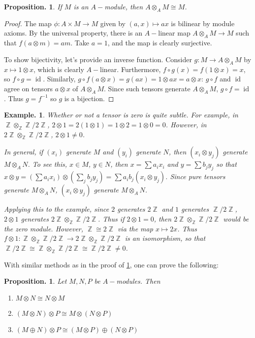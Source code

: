 \documentclass[11pt, a4paper]{memoir}
\DeclareMathOperator{\Z}{{\mathbb{Z}}}
\theoremstyle{change}
\newtheorem{proposition}[theorem]{Proposition.}
\theoremstyle{plain}
\theoremstyle{nonumberplain}
\newtheorem{example}{Example.}
\newtheorem{proof}{Proof}
\DeclareMathOperator{\id}{id}
\numberwithin{equation}{section}
\begin{document}
\begin{proposition}\label{prop:t_equiv}
    If $M$ is an $A-$module, then $A\otimes_A M\cong M$.
\end{proposition}
\begin{proof}
    The map $\phi:A\times M\to M$ given by $(a,x)\mapsto ax$ is bilinear by module axioms.
    By the universal property, there is an $A-$linear map $A\otimes_A M\to M$ such that $f(a\otimes m)=am$.
    Take $a=1$, and the map is clearly surjective.

    To show bijectivity, let's provide an inverse function.
    Consider $g:M\to A\otimes_A M$ by $x\mapsto 1\otimes x$, which is clearly $A-$linear.
    Furthermore, $f\circ g(x)=f(1\otimes x)=x$, so $f\circ g=\id$.
    Similarly, $g\circ f(a\otimes x)=g(ax)=1\otimes ax=a\otimes x$: $g\circ f$ and $\id$ agree on tensors $a\otimes x$ of $A\otimes_A M$.
    Since such tensors generate $A\otimes_A M$, $g\circ f=\id$.
    Thus $g=f^{-1}$ so $g$ is a bijection.
\end{proof}
\begin{example}
    Whether or not a tensor is zero is quite subtle.
    For example, in $\Z\otimes_{\Z}\Z/2\Z$, $2\otimes 1=2(1\otimes 1)=1\otimes 2=1\otimes 0=0$.
    However, in $2\Z\otimes_{\Z}\Z/2\Z$, $2\otimes 1\neq 0$.

    In general, if $(x_i)$ generate $M$ and $(y_i)$ generate $N$, then $(x_i\otimes y_j)$ generate $M\otimes_A N$.
    To see this, $x\in M$, $y\in N$, then $x=\sum a_ix_i$ and $y=\sum b_jy_j$ so that $x\otimes y=(\sum a_ix_i)\otimes(\sum_j b_jy_j)=\sum a_ib_j(x_i\otimes y_j)$.
    Since pure tensors generate $M\otimes_A N$, $(x_i\otimes y_j)$ generate $M\otimes_A N$.
    
    Applying this to the example, since $2$ generates $2\Z$ and $1$ generates $\Z/2\Z$, $2\otimes 1$ generates $2\Z\otimes_{\Z}\Z/2\Z$.
    Thus if $2\otimes 1=0$, then $2\Z\otimes_{\Z}\Z/2\Z$ would be the zero module.
    However, $\Z\cong 2\Z$ via the map $x\mapsto 2x$.
    Thus $f\otimes 1:\Z\otimes_{\Z}\Z/2\Z\to2\Z\otimes_{\Z}\Z/2\Z$ is an isomorphism, so that $\Z/2\Z\cong\Z\otimes_{\Z}\Z/2\Z\cong\Z/2\Z\neq 0$.
\end{example}
With similar methods as in the proof of \cref{prop:t_equiv}, one can prove the following:
\begin{proposition}
    Let $M,N,P$ be $A-$modules.
    Then
    \begin{enumerate}[nolistsep]
        \item $M\otimes N\cong N\otimes M$
        \item $(M\otimes N)\otimes P\cong M\otimes(N\otimes P)$
        \item $(M\oplus N)\otimes P\cong(M\otimes P)\oplus(N\otimes P)$
    \end{enumerate}
\end{proposition}
\end{document}
